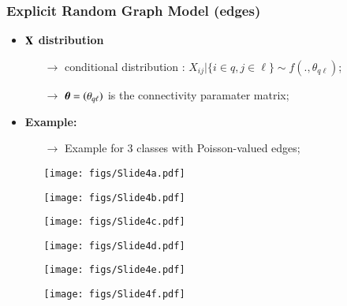 \documentclass{beamer}
\newcommand{\Xbf}{{\bf X}}
\newcommand{\thetabf}{\mbox{\mathversion{bold}{$\theta$}}}
\begin{document}
\begin{frame}
  \frametitle{Explicit Random Graph Model (edges)}
  \begin{itemize}
  \item \textbf{$\Xbf$ distribution}
    \begin{itemize}
    \item[\bf{$\rightarrow$}] conditional distribution : $X_{ij}| \{i
      \in q, j \in \ell\} \sim f(.,\theta_{q\ell})$;\medskip
    \item[\bf{$\rightarrow$}] $\thetabf=(\theta_{q\ell})$ is the
      connectivity paramater matrix;\medskip
    \end{itemize}
    \medskip

    \pause
  \item \textbf{Example:}
    \begin{itemize}
    \item[\bf{$\rightarrow$}] Example for $3$ classes with
      Poisson-valued edges;
    \item[]
      \begin{overprint}
        \begin{center}
          \texttt{[image: figs/Slide4a.pdf]}
        \end{center}
        \begin{center}
          \texttt{[image: figs/Slide4b.pdf]}
        \end{center}
        \begin{center}
          \texttt{[image: figs/Slide4c.pdf]}
        \end{center}
        \begin{center}
          \texttt{[image: figs/Slide4d.pdf]}
        \end{center}
        \begin{center}
          \texttt{[image: figs/Slide4e.pdf]}
        \end{center}
        \begin{center}
          \texttt{[image: figs/Slide4f.pdf]}
        \end{center}
      \end{overprint}
    \end{itemize}
  \end{itemize}
  \medskip

\end{frame}
\end{document}
